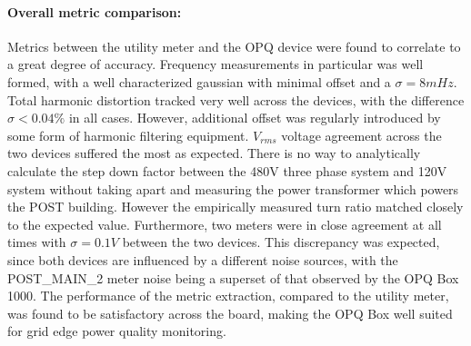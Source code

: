 \paragraph{Overall metric comparison:}
Metrics between the utility meter and the OPQ device were found to correlate to a great degree of accuracy.
Frequency measurements in particular was well formed, with a well characterized gaussian with minimal offset and a $\sigma =8mHz$.
Total harmonic distortion tracked very well across the devices, with the difference $\sigma < 0.04\%$ in all cases.
However, additional offset was regularly introduced by some form of harmonic filtering equipment.
$V_{rms}$ voltage agreement across the two devices suffered the most as expected.
There is no way to analytically calculate the step down factor between the 480V three phase system and 120V system without taking apart and measuring the power transformer which powers the POST building.
However the empirically measured turn ratio matched closely to the expected value.
Furthermore, two meters were in close agreement at all times with $\sigma =0.1V$ between the two devices.
This discrepancy was expected, since both devices are influenced by a different noise sources, with the POST\_MAIN\_2 meter noise being a superset of that observed by the OPQ Box 1000.
The performance of the metric extraction, compared to the utility meter, was found to be satisfactory across the board, making the OPQ Box well suited for grid edge power quality monitoring.

